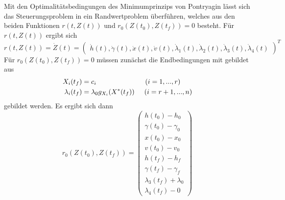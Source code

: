 Mit den Optimalitätsbedingungen des Minimumprinzips von Pontryagin lässt sich das Steuerungsproblem in ein Randwertproblem überführen, welches aus den beiden Funktionen $r(t,Z(t))$ und $r_0(Z(t_0),Z(t_f)) = 0$ besteht. Für $r(t,Z(t))$ ergibt sich \[r(t,Z(t)) = \dot{Z}(t) = \begin{pmatrix}
\dot{h}(t),\dot{\gamma}(t),\dot{x}(t),\dot{v}(t),\dot{\lambda}_1(t),\dot{\lambda}_2(t),\dot{\lambda}_3(t),\dot{\lambda}_4(t)
\end{pmatrix}^T\] Für $r_0(Z(t_0),Z(t_f)) = 0$ müssen zunächst die Endbedingungen mit gebildet aus 
\[\begin{split}
X_i(t_f) &= c_i \hspace{25mm} (i=1,...,r) \\\
\lambda_i(t_f) &= \lambda_0 g_{X_i}(X^{\ast}(t_f)) \hspace{5mm} (i=r+1,...,n)
\end{split}\] gebildet werden. Es ergibt sich dann \[r_0(Z(t_0),Z(t_f)) = \begin{pmatrix}
h(t_0) - h_0 \\ 
\gamma(t_0) - \gamma_0 \\
x(t_0) - x_0 \\ 
v(t_0) - v_0 \\ 
h(t_f) - h_f \\ 
\gamma(t_f) - \gamma_f \\
\lambda_3(t_f) + \lambda_0 \\ 
\lambda_4(t_f) - 0
\end{pmatrix}\]
